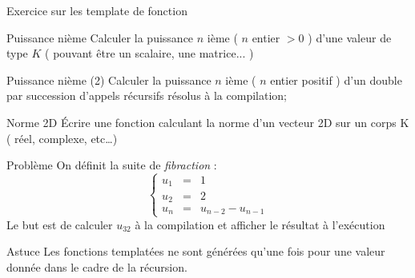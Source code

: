 \documentclass[compress,10pt,aspectratio=169]{beamer}
\begin{document}
\begin{frame}[fragile]{Exercice sur les template de fonction}
  \scriptsize\vspace*{-3mm}
  \begin{exampleblock}{\small Puissance nième}
  Calculer la puissance $n$ ième ( $n$ entier $>0$ ) d'une valeur de type $K$ ( pouvant être un scalaire, une matrice... )
  \end{exampleblock}
  
  \vspace*{-3mm}
  \begin{exampleblock}{\small Puissance nième (2)}
  Calculer la puissance $n$ ième ( $n$ entier positif ) d'un double par succession d'appels récursifs résolus à la compilation;
  \end{exampleblock}
  
  \vspace*{-3mm}
  \begin{exampleblock}{\small Norme 2D}
  Écrire une fonction calculant la norme d'un vecteur 2D sur un corps K ( réel, complexe, etc\ldots)
  \end{exampleblock}
  
  \vspace*{-3mm}
  \begin{exampleblock}{\small Problème}
  On définit la suite de \textsl{fibraction} :
  \[
  \left\{
  \begin{array}{rcl}
  u_{1} & = & 1 \\
  u_{2} & = & 2 \\
  u_{n} & = & u_{n-2} - u_{n-1}
  \end{array}
  \right.
  \]
  Le but est de calculer $u_{32}$ à la compilation et afficher le résultat à l'exécution
  \vspace*{-2mm}
  \begin{block}{\small Astuce}
  Les fonctions templatées ne sont générées qu'une fois pour une valeur donnée dans le cadre de la récursion.
  \end{block}
  \end{exampleblock}
\end{frame}
\end{document}
